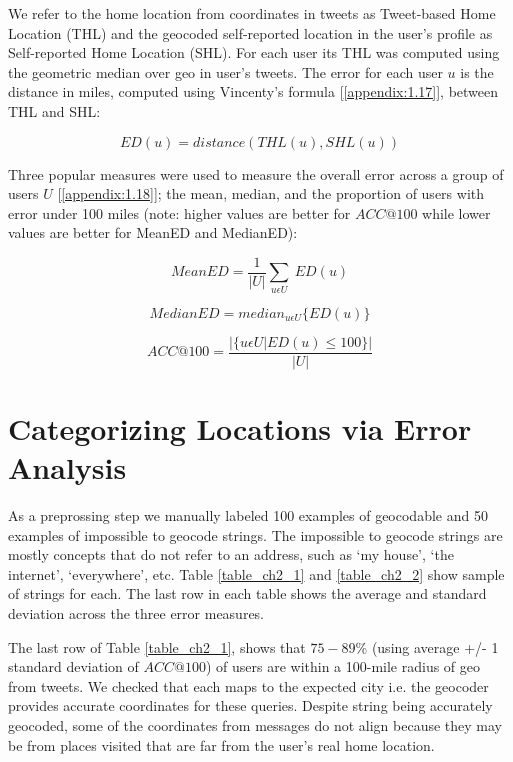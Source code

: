 We refer to the home location from coordinates in tweets as Tweet-based Home Location (THL) and the geocoded self-reported location in the user's profile as Self-reported Home Location (SHL). For each user its THL was computed using the  geometric median over geo in user's tweets. The error for each user $u$ is the distance in miles, computed using Vincenty's formula [\ref{appendix:1.17}], between THL and SHL:

\begin{equation}
ED(u) = distance(THL(u), SHL(u))
\end{equation}

Three popular measures were used to measure the overall error across a group of users $U$ [\ref{appendix:1.18}]; the mean, median, and the proportion of users with error under 100 miles (note: higher values are better for $ACC@100$ while lower values are better for MeanED and MedianED):

\begin{equation}
MeanED = \frac{1}{|U|}\sum_{u \epsilon U}\ ED(u)
\end{equation}

\begin{equation}
MedianED = median_{u \epsilon U}\{ED(u)\}
\end{equation}

\begin{equation}
ACC@100 = \frac{|\{u \epsilon U|ED(u)\leq 100\}|}{|U|}
\end{equation}

\section{Categorizing Locations via Error Analysis}
As a preprossing step we manually labeled  100 examples of geocodable and 50 examples of impossible to geocode strings. The impossible to geocode strings are mostly concepts that do not refer to an address, such as `my house', `the internet', `everywhere', etc.  Table \ref{table_ch2_1} and \ref{table_ch2_2} show sample of strings for each. The last row in each table shows the average and standard deviation across the three error measures.

The last row of Table \ref{table_ch2_1}, shows that $75-89$\% (using average +/- 1 standard deviation of $ACC@100$) of users are within a 100-mile radius of geo from tweets. We checked that each maps to the expected city i.e. the geocoder provides accurate coordinates for these queries. Despite string being accurately geocoded, some of the coordinates from messages do not align because they may be from places visited that are far from the user's real home location.

